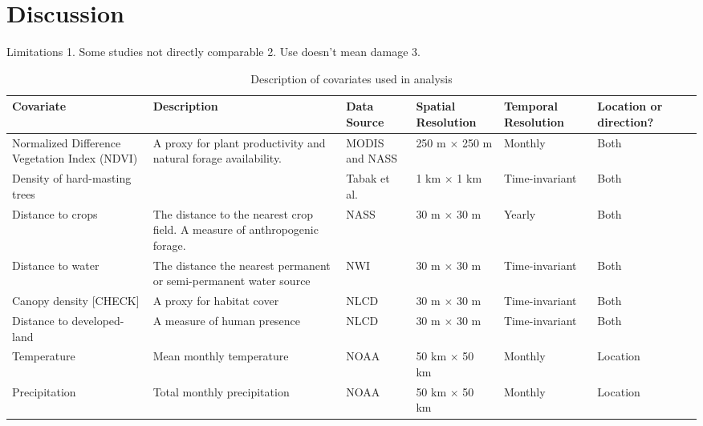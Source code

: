 \documentclass[a4paper]{article}
\begin{document}
\section*{Discussion}

Limitations
1. Some studies not directly comparable
2. Use doesn't mean damage
3.

\singlespacing



\clearpage

\def\arraystretch{1.5}
\begin{sidewaystable}
\caption{Description of covariates used in analysis}
\begin{tabular}{p{4 cm}  p{4 cm}  p{4 cm}  p{4 cm}  p{4 cm}  p{2 cm} p{2cm}}
	Covariate & Description & Data Source & Spatial Resolution & Temporal Resolution & Location \newline or direction? \\
	\hline
	Normalized Difference \newline Vegetation Index (NDVI) & A proxy for plant productivity and natural forage availability.  & MODIS and NASS & 250 m $\times$ 250 m & Monthly & Both \\ 
	Density of hard-masting trees & & Tabak et al. & 1 km $\times$ 1 km & Time-invariant & Both \\
	Distance to crops & The distance to the nearest crop field. A measure of anthropogenic forage. & NASS & 30 m $\times$ 30 m & Yearly & Both \\
	Distance to water & The distance the nearest permanent or semi-permanent water source & NWI & 30 m $\times$ 30 m & Time-invariant & Both \\
	Canopy density [CHECK] & A proxy for habitat cover & NLCD & 30 m $\times$ 30 m & Time-invariant & Both \\
	Distance to developed-land & A measure of human presence & NLCD & 30 m $\times$ 30 m & Time-invariant & Both \\
	Temperature & Mean monthly temperature & NOAA & 50 km $\times$ 50 km & Monthly & Location \\
	Precipitation & Total monthly precipitation & NOAA & 50 km $\times$ 50 km & Monthly & Location \\

\end{tabular}
\end{sidewaystable}



\end{document}
